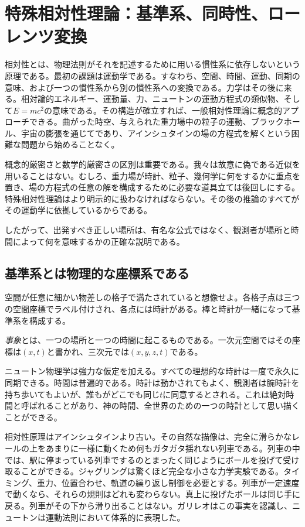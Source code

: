 \chapter{特殊相対性理論：基準系、同時性、ローレンツ変換}

相対性とは、物理法則がそれを記述するために用いる慣性系に依存しないという原理である。最初の課題は運動学である。すなわち、空間、時間、運動、同期の意味、および一つの慣性系から別の慣性系への変換である。力学はその後に来る。相対論的エネルギー、運動量、力、ニュートンの運動方程式の類似物、そして\(E=mc^2\)の意味である。その構造が確立すれば、一般相対性理論に概念的アプローチできる。曲がった時空、与えられた重力場中の粒子の運動、ブラックホール、宇宙の膨張を通じてであり、アインシュタインの場の方程式を解くという困難な問題から始めることなく。

概念的厳密さと数学的厳密さの区別は重要である。我々は故意に偽である近似を用いることはない。むしろ、重力場が時計、粒子、幾何学に何をするかに重点を置き、場の方程式の任意の解を構成するために必要な道具立ては後回しにする。特殊相対性理論はより明示的に扱わなければならない。その後の推論のすべてがその運動学に依拠しているからである。

したがって、出発すべき正しい場所は、有名な公式ではなく、観測者が場所と時間によって何を意味するかの正確な説明である。

\section{基準系とは物理的な座標系である}

空間が任意に細かい物差しの格子で満たされていると想像せよ。各格子点は三つの空間座標でラベル付けされ、各点には時計がある。棒と時計が一緒になって基準系を構成する。

\begin{definition}
\emph{事象}とは、一つの場所と一つの時間に起こるものである。一次元空間ではその座標は\((x,t)\)と書かれ、三次元では\((x,y,z,t)\)である。
\end{definition}

ニュートン物理学は強力な仮定を加える。すべての理想的な時計は一度で永久に同期できる。時間は普遍的である。時計は動かされてもよく、観測者は腕時計を持ち歩いてもよいが、誰もがどこでも同じ\(t\)に同意するとされる。これは絶対時間と呼ばれることがあり、神の時間、全世界のための一つの時計として思い描くことができる。

相対性原理はアインシュタインより古い。その自然な描像は、完全に滑らかなレールの上をあまりに一様に動くため何もガタガタ揺れない列車である。列車の中では、駅に停まっている列車でするのとまったく同じようにボールを投げて受け取ることができる。ジャグリングは驚くほど完全な小さな力学実験である。タイミング、重力、位置合わせ、軌道の繰り返し制御を必要とする。列車が一定速度で動くなら、それらの規則はどれも変わらない。真上に投げたボールは同じ手に戻る。列車がその下から滑り出ることはない。ガリレオはこの事実を認識し、ニュートンは運動法則において体系的に表現した。

